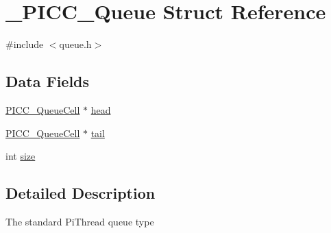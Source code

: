 \hypertarget{struct__PICC__Queue}{\section{\-\_\-\-P\-I\-C\-C\-\_\-\-Queue Struct Reference}
\label{struct__PICC__Queue}
}


{\ttfamily \#include $<$queue.\-h$>$}

\subsection*{Data Fields}
{\bf }\par
\begin{DoxyCompactItemize}
\item 
\hyperlink{queue_8h_a04742445225861b107e4ee16cfb5c71b}{P\-I\-C\-C\-\_\-\-Queue\-Cell} $\ast$ \hyperlink{struct__PICC__Queue_a6c2dd9f76d29fead606644750d8c6199}{head}
\item 
\hyperlink{queue_8h_a04742445225861b107e4ee16cfb5c71b}{P\-I\-C\-C\-\_\-\-Queue\-Cell} $\ast$ \hyperlink{struct__PICC__Queue_a044a1d467b0682868f9ad43dfd93f146}{tail}
\item 
int \hyperlink{struct__PICC__Queue_aceb7033dbeed397b770d1e0fcb641ffb}{size}
\end{DoxyCompactItemize}



\subsection{Detailed Description}
The standard Pi\-Thread queue type 

